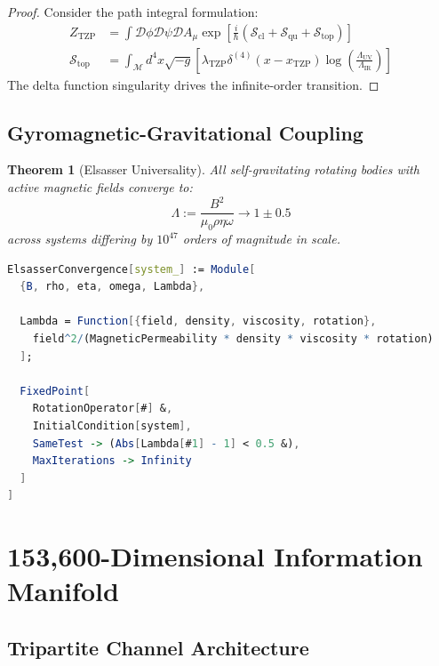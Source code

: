 \documentclass[11pt,a4paper]{article}
\newtheorem{theorem}{Theorem}
\DeclareMathOperator{\TZP}{TZP}
\begin{document}
\begin{proof}
Consider the path integral formulation:
\begin{align}
Z_{\TZP} &= \int \mathcal{D}\phi \mathcal{D}\psi \mathcal{D}A_\mu \exp\left[\frac{i}{\hbar}\left(\mathcal{S}_{\text{cl}} + \mathcal{S}_{\text{qu}} + \mathcal{S}_{\text{top}}\right)\right] \\
\mathcal{S}_{\text{top}} &= \int_{\mathcal{M}} d^4x \sqrt{-g} \left[\lambda_{\TZP} \delta^{(4)}(x-x_{\TZP}) \log\left(\frac{\Lambda_{\text{UV}}}{\Lambda_{\text{IR}}}\right)\right]
\end{align}
The delta function singularity drives the infinite-order transition.
\end{proof}


\subsection{Gyromagnetic-Gravitational Coupling}


\begin{theorem}[Elsasser Universality]
All self-gravitating rotating bodies with active magnetic fields converge to:
\begin{equation}
\Lambda := \frac{B^2}{\mu_0 \rho \eta \omega} \to 1 \pm 0.5
\end{equation}
across systems differing by $10^{47}$ orders of magnitude in scale.
\end{theorem}


\begin{lstlisting}[language=Mathematica]
ElsasserConvergence[system_] := Module[
  {B, rho, eta, omega, Lambda},
  
  Lambda = Function[{field, density, viscosity, rotation},
    field^2/(MagneticPermeability * density * viscosity * rotation)
  ];
  
  FixedPoint[
    RotationOperator[#] &,
    InitialCondition[system],
    SameTest -> (Abs[Lambda[#1] - 1] < 0.5 &),
    MaxIterations -> Infinity
  ]
]
\end{lstlisting}


\section{153,600-Dimensional Information Manifold}


\subsection{Tripartite Channel Architecture}
\end{document}

